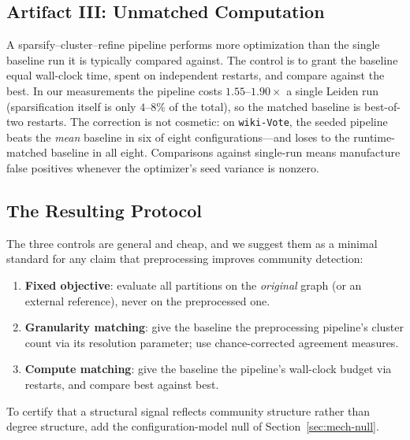 \subsection{Artifact III: Unmatched Computation}
\label{sec:artifact-compute}

A sparsify--cluster--refine pipeline performs more optimization than the single baseline run it is typically compared against.
The control is to grant the baseline equal wall-clock time, spent on independent restarts, and compare against the best.
In our measurements the pipeline costs $1.55$--$1.90\times$ a single Leiden run (sparsification itself is only $4$--$8\%$ of the total), so the matched baseline is best-of-two restarts.
The correction is not cosmetic: on \texttt{wiki-Vote}, the seeded pipeline beats the \emph{mean} baseline in six of eight configurations---and loses to the runtime-matched baseline in all eight.
Comparisons against single-run means manufacture false positives whenever the optimizer's seed variance is nonzero.

\subsection{The Resulting Protocol}
\label{sec:protocol}

The three controls are general and cheap, and we suggest them as a minimal standard for any claim that preprocessing improves community detection:
\begin{enumerate}
    \item \textbf{Fixed objective}: evaluate all partitions on the \emph{original} graph (or an external reference), never on the preprocessed one.
    \item \textbf{Granularity matching}: give the baseline the preprocessing pipeline's cluster count via its resolution parameter; use chance-corrected agreement measures.
    \item \textbf{Compute matching}: give the baseline the pipeline's wall-clock budget via restarts, and compare best against best.
\end{enumerate}
To certify that a structural signal reflects community structure rather than degree structure, add the configuration-model null of Section~\ref{sec:mech-null}.
